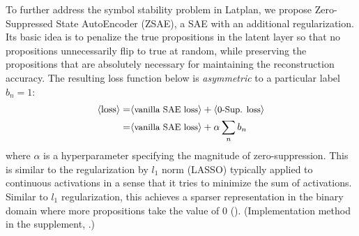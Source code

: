 
To further address the symbol stability problem in Latplan,
we propose Zero-Suppressed State AutoEncoder (ZSAE),
a SAE with an additional regularization.
% 
Its basic idea is to penalize the
true propositions in the latent layer so that no propositions unnecessarily flip to true at random,
while preserving the propositions that are absolutely necessary for maintaining the reconstruction accuracy.
% 
The resulting loss function below is 
\emph{asymmetric} to a particular label $b_n=1$:
\begin{align*}
 \brackets{\text{loss}} = & \brackets{\text{\small vanilla SAE loss}} + \brackets{\text{\small 0-Sup. loss}} \\ 
 =                        & \brackets{\text{\small vanilla SAE loss}} + \alpha \sum_n b_n
\end{align*}
where $\alpha$ is a hyperparameter specifying the magnitude of zero-suppression.
This is similar to the regularization by $l_1$ norm (LASSO) typically applied to continuous activations
in a sense that it tries to minimize the sum of activations.
Similar to $l_1$ regularization, this achieves a sparser representation in the binary domain where
more propositions take the value of 0 ().
(Implementation method in the supplement, .)


